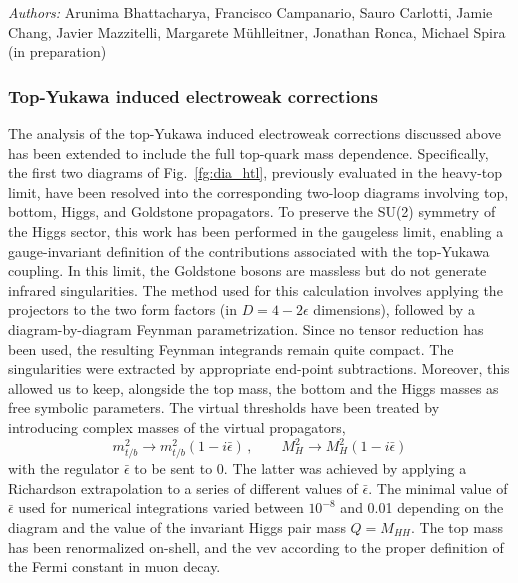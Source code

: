 \textit{Authors:} Arunima Bhattacharya, Francisco Campanario, Sauro Carlotti, Jamie Chang, Javier Mazzitelli, Margarete Mühlleitner, Jonathan Ronca, Michael Spira (in preparation)
\subsubsection{Top-Yukawa induced electroweak corrections}
The analysis of the top-Yukawa induced electroweak corrections discussed above has been extended to include the full top-quark mass dependence. Specifically, the first two diagrams of Fig.~\ref{fg:dia_htl}, previously evaluated in the heavy-top limit, have been resolved into the corresponding two-loop diagrams involving top, bottom, Higgs, and Goldstone propagators. To preserve the SU(2) symmetry of the Higgs sector, this work has been performed in the gaugeless limit, enabling a gauge-invariant definition of the contributions associated with the top-Yukawa coupling. In this limit, the Goldstone bosons are massless but do not generate infrared singularities. The method used for this calculation involves applying the projectors to the two form factors (in $D=4-2\epsilon$ dimensions), followed by a diagram-by-diagram Feynman parametrization. Since no tensor reduction has been used, the resulting Feynman integrands remain quite compact. The singularities were extracted by appropriate end-point subtractions. Moreover, this allowed us to keep, alongside the top mass, the bottom and the Higgs masses as free symbolic parameters. The virtual thresholds have been treated by introducing complex masses of the virtual propagators,
\begin{equation}
m_{t/b}^2 \to m_{t/b}^2 (1-i\bar\epsilon) \, , \qquad M_H^2 \to M_H^2 (1-i\bar\epsilon)
\end{equation}
with the regulator $\bar\epsilon$ to be sent to 0. The latter was achieved by applying a Richardson extrapolation \cite{Richardson} to a series of different values of $\bar\epsilon$. The minimal value of $\bar\epsilon$ used for numerical integrations varied between $10^{-8}$ and 0.01 depending on the diagram and the value of the invariant Higgs pair mass $Q=M_{HH}$. The top mass has been renormalized on-shell, and the vev according to the proper definition of the Fermi constant in muon decay.

